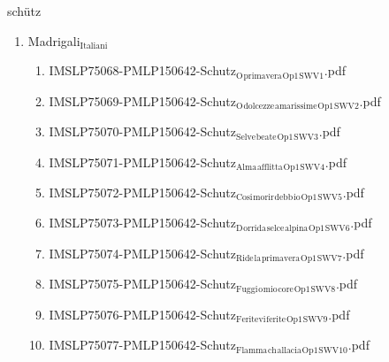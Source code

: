 \documentclass[11pt]{article}
\begin{document}
\item schütz
\label{sec-1-1-1-1-44-62}
\begin{enumerate}
\item Madrigali$_{\text{Italiani}}$
\label{sec-1-1-1-1-44-62-1}
\begin{enumerate}
\item IMSLP75068-PMLP150642-Schutz$_{\text{O}}$$_{\text{primavera}}$$_{\text{Op1}}$$_{\text{SWV1}}$.pdf
\label{sec-1-1-1-1-44-62-1-1}

\item IMSLP75069-PMLP150642-Schutz$_{\text{O}}$$_{\text{dolcezze}}$$_{\text{amarissime}}$$_{\text{Op1}}$$_{\text{SWV2}}$.pdf
\label{sec-1-1-1-1-44-62-1-2}

\item IMSLP75070-PMLP150642-Schutz$_{\text{Selve}}$$_{\text{beate}}$$_{\text{Op1}}$$_{\text{SWV3}}$.pdf
\label{sec-1-1-1-1-44-62-1-3}

\item IMSLP75071-PMLP150642-Schutz$_{\text{Alma}}$$_{\text{afflitta}}$$_{\text{Op1}}$$_{\text{SWV4}}$.pdf
\label{sec-1-1-1-1-44-62-1-4}

\item IMSLP75072-PMLP150642-Schutz$_{\text{Cosi}}$$_{\text{morir}}$$_{\text{debb}}$$_{\text{io}}$$_{\text{Op1}}$$_{\text{SWV5}}$.pdf
\label{sec-1-1-1-1-44-62-1-5}

\item IMSLP75073-PMLP150642-Schutz$_{\text{D}}$$_{\text{orrida}}$$_{\text{selce}}$$_{\text{alpina}}$$_{\text{Op1}}$$_{\text{SWV6}}$.pdf
\label{sec-1-1-1-1-44-62-1-6}

\item IMSLP75074-PMLP150642-Schutz$_{\text{Ride}}$$_{\text{la}}$$_{\text{primavera}}$$_{\text{Op1}}$$_{\text{SWV7}}$.pdf
\label{sec-1-1-1-1-44-62-1-7}

\item IMSLP75075-PMLP150642-Schutz$_{\text{Fuggi}}$$_{\text{o}}$$_{\text{mio}}$$_{\text{core}}$$_{\text{Op1}}$$_{\text{SWV8}}$.pdf
\label{sec-1-1-1-1-44-62-1-8}

\item IMSLP75076-PMLP150642-Schutz$_{\text{Feritevi}}$$_{\text{ferite}}$$_{\text{Op1}}$$_{\text{SWV9}}$.pdf
\label{sec-1-1-1-1-44-62-1-9}

\item IMSLP75077-PMLP150642-Schutz$_{\text{Flamma}}$$_{\text{ch}}$$_{\text{allacia}}$$_{\text{Op1}}$$_{\text{SWV10}}$.pdf
\label{sec-1-1-1-1-44-62-1-10}


\end{enumerate}
\end{enumerate}
\end{document}
